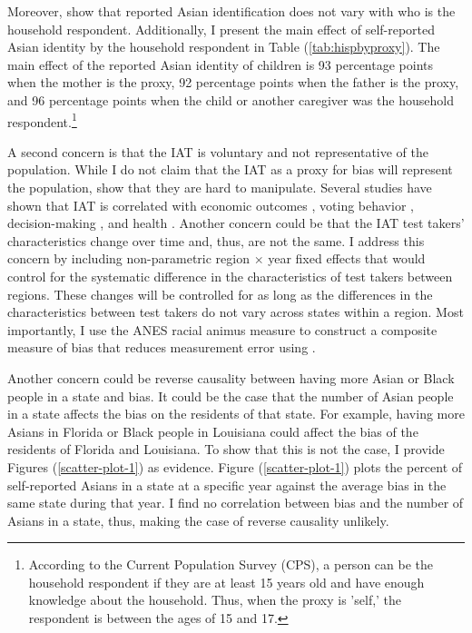 Moreover, \textcite{duncanIntermarriageIntergenerationalTransmission2011} show that reported Asian identification does not vary with who is the household respondent. Additionally, I present the main effect of self-reported Asian identity by the household respondent in Table (\ref{tab:hispbyproxy}). The main effect of the reported Asian identity of children is 93 percentage points when the mother is the proxy, 92 percentage points when the father is the proxy, and 96 percentage points when the child or another caregiver was the household respondent.\footnote{According to the Current Population Survey (CPS), a person can be the household respondent if they are at least 15 years old and have enough knowledge about the household. Thus, when the proxy is 'self,' the respondent is between the ages of 15 and 17.} 

A second concern is that the IAT is voluntary and not representative of the population. While I do not claim that the IAT  as a proxy for bias will represent the population, \textcite{egloffPredictiveValidityImplicit2002} show that they are hard to manipulate. Several studies have shown that IAT is correlated with economic outcomes \autocite{chettyRaceEconomicOpportunity2020,gloverDiscriminationSelfFulfillingProphecy2017}, voting behavior \autocite{friesePredictingVotingBehavior2007}, decision-making \autocite{bertrandImplicitDiscrimination2005,carlanaImplicitStereotypesEvidence2019}, and health \autocite{leitnerRacialBiasAssociated2016}. Another concern could be that the IAT test takers' characteristics change over time and, thus, are not the same. I address this concern by including non-parametric region $\times$ year fixed effects that would control for the systematic difference in the characteristics of test takers between regions. These changes will be controlled for as long as the differences in the characteristics between test takers do not vary across states within a region. Most importantly, I use the ANES racial animus measure to construct a composite measure of bias that reduces measurement error using \textcite{lubotskyInterpretationRegressionsMultiple2006}.

Another concern could be reverse causality between having more Asian or Black people in a state and bias. It could be the case that the number of Asian people in a state affects the bias on the residents of that state. For example, having more Asians in Florida or Black people in Louisiana could affect the  bias of the residents of Florida and Louisiana. To show that this is not the case, I provide Figures (\ref{scatter-plot-1}) as evidence. Figure (\ref{scatter-plot-1}) plots the percent of self-reported Asians in a state at a specific year against the average  bias in the same state during that year. I find no correlation between bias and the number of Asians in a state, thus, making the case of reverse causality unlikely. 

